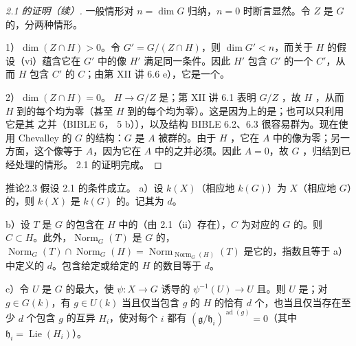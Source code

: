 \begin{proof}[ 2.1 的证明（续）]
一般情形对 $n=\dim G$ 归纳，$n=0$ 时断言显然。令 $Z$ 是 $G$ 的，分两种情形。

1）$\dim(Z\cap H)>0$。令 $G'=G/(Z\cap H)$，则 $\dim G'<n$，而关于 $H$ 的假设（vi）蕴含它在 $G'$ 中的像 $H'$ 满足同一条件。因此 $H'$ 包含 $G'$ 的一个 $C'$，从而 $H$ 包含 $C'$ 的 $C$；由第 XII 讲 6.6 e），它是一个。

2）$\dim(Z\cap H)=0$。 $H\to G/Z$ 是；第 XII 讲 6.1 表明 $G/Z$ ，故 $H$ ，从而 $H$ 到的每个均为零（甚至 $H$ 到的每个均为零）。这是因为上的是；也可以只利用它是其 之并（BIBLE 6， 5 b）），以及结构 BIBLE 6.2、6.3 很容易群为。现在使用 Chevalley 的 $G$ 的结构：$G$ 是 $A$ 被群的。由于 $H$ ，它在 $A$ 中的像为零；另一方面，这个像等于 $A$，因为它在 $A$ 中的之并必须。因此 $A=0$，故 $G$ ，归结到已经处理的情形。 2.1 的证明完成。
\end{proof}
\begin{SGAresult}{推论}{2.3}
假设 2.1 的条件成立。
 a）设 $k(X)$（相应地 $k(G)$）为 $X$（相应地 $G$）的，则 $k(X)$ 是 $k(G)$ 的。记其为 $d$。

 b）设 $T$ 是 $G$ 的包含在 $H$ 中的（由 2.1（ii）存在），$C$ 为对应的 $G$ 的。则 $C\subset H$。此外，$\operatorname{Norm}_G(T)$ 是 $G$ 的，$\operatorname{Norm}_G(T)\cap\operatorname{Norm}_G(H)=\operatorname{Norm}_{\operatorname{Norm}_G(H)}(T)$ 是它的，指数且等于 a）中定义的 $d$。包含给定或给定的 $H$ 的数目等于 $d$。

 c）令 $U$ 是 $G$ 的最大，使 $\psi:X\to G$ 诱导的 $\psi^{-1}(U)\to U$ 且。则 $U$ 是；对 $g\in G(k)$，有 $g\in U(k)$ 当且仅当包含 $g$ 的 $H$ 的恰有 $d$ 个，也当且仅当存在至少 $d$ 个包含 $g$ 的互异 $H_i$，使对每个 $i$ 都有 $(\mathfrak g/\mathfrak h_i)^{\operatorname{ad}(g)}=0$（其中 $\mathfrak h_i=\operatorname{Lie}(H_i)$）。
\end{SGAresult}
